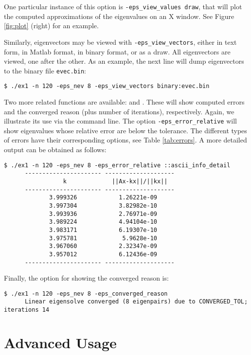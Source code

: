 One particular instance of this option is \Verb!-eps_view_values draw!, that will plot the computed approximations of the eigenvalues on an X window. See Figure \ref{fig:plot} (right) for an example.

Similarly, eigenvectors may be viewed with \Verb!-eps_view_vectors!, either in text form, in Matlab format, in binary format, or as a draw. All eigenvectors are viewed, one after the other. As an example, the next line will dump eigenvectors to the binary file \texttt{evec.bin}:
\begin{Verbatim}[fontsize=\footnotesize,numbers=none]
   $ ./ex1 -n 120 -eps_nev 8 -eps_view_vectors binary:evec.bin
\end{Verbatim}

Two more related functions are available:  and . These will show computed errors and the converged reason (plus number of iterations), respectively. Again, we illustrate its use via the command line. The option \Verb!-eps_error_relative! will show eigenvalues whose relative error are below the tolerance. The different types of errors have their corresponding options, see Table \ref{tab:errors}. A more detailed output can be obtained as follows:
\begin{Verbatim}[fontsize=\footnotesize,numbers=none]
   $ ./ex1 -n 120 -eps_nev 8 -eps_error_relative ::ascii_info_detail
      ---------------------- --------------------
                 k             ||Ax-kx||/||kx||
      ---------------------- --------------------
             3.999326            1.26221e-09
             3.997304            3.82982e-10
             3.993936            2.76971e-09
             3.989224            4.94104e-10
             3.983171            6.19307e-10
             3.975781             5.9628e-10
             3.967060            2.32347e-09
             3.957012            6.12436e-09
      ---------------------- --------------------
\end{Verbatim}

Finally, the option for showing the converged reason is:
\begin{Verbatim}[fontsize=\footnotesize,numbers=none]
   $ ./ex1 -n 120 -eps_nev 8 -eps_converged_reason
      Linear eigensolve converged (8 eigenpairs) due to CONVERGED_TOL; iterations 14
\end{Verbatim}

\section{Advanced Usage}

